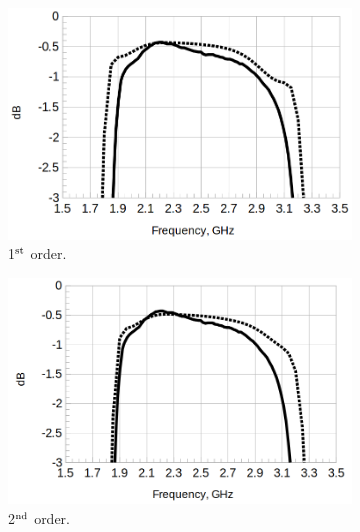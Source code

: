 \documentclass[titlepage]{article}
\renewcommand\_{\textunderscore\linebreak[1]}
\begin{document}
\begin{figure}[p]
  \centering
  \begin{subfigure}{0.45\textwidth}
     \includegraphics[width=\linewidth]{../regression/OpenParEM3D/microstrip/filter_study/screenshots/microstrip_filter_1st_order_zoom.png}
     \caption{1$^{\textnormal{st}}$ order.}
  \end{subfigure}
  \begin{subfigure}{0.45\textwidth}
     \includegraphics[width=\linewidth]{../regression/OpenParEM3D/microstrip/filter_study/screenshots/microstrip_filter_2nd_order_zoom.png}
     \caption{2$^{\textnormal{nd}}$ order.}
  \end{subfigure}
  \begin{subfigure}{0.45\textwidth}

\end{subfigure}
\end{figure}
\end{document}
